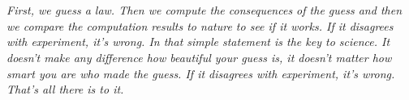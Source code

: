 \thispagestyle{empty}
\section*{}
%

\vspace*{\fill}
{
\textit{\justify
   First, we guess a law. Then we compute the consequences of the guess and then we compare the computation results to nature to see if it works.
  If it disagrees with experiment, it's wrong. In that simple statement is the key to science.
   It doesn't make any difference how beautiful your guess is, it doesn't matter how smart you are who made the guess. If it disagrees with experiment, it's wrong. That's all there is to it.}

  \par\bigskip
  \par%
}

\vspace*{\fill}
%
%
%
%

\vfill




